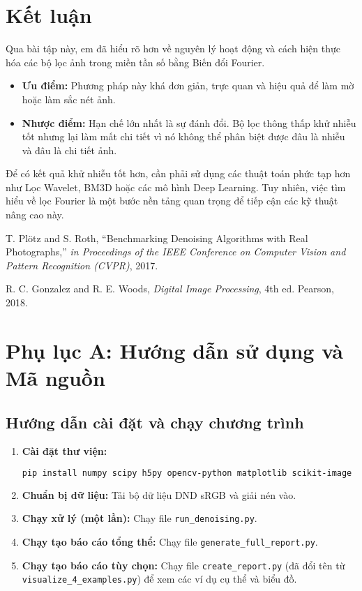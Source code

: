 \documentclass[12pt, a4paper]{article}
\begin{document}
	\section{Kết luận}
	Qua bài tập này, em đã hiểu rõ hơn về nguyên lý hoạt động và cách hiện thực hóa các bộ lọc ảnh trong miền tần số bằng Biến đổi Fourier.
	\begin{itemize}
		\item \textbf{Ưu điểm:} Phương pháp này khá đơn giản, trực quan và hiệu quả để làm mờ hoặc làm sắc nét ảnh.
		\item \textbf{Nhược điểm:} Hạn chế lớn nhất là sự đánh đổi. Bộ lọc thông thấp khử nhiễu tốt nhưng lại làm mất chi tiết vì nó không thể phân biệt được đâu là nhiễu và đâu là chi tiết ảnh.
	\end{itemize}
	Để có kết quả khử nhiễu tốt hơn, cần phải sử dụng các thuật toán phức tạp hơn như Lọc Wavelet, BM3D hoặc các mô hình Deep Learning. Tuy nhiên, việc tìm hiểu về lọc Fourier là một bước nền tảng quan trọng để tiếp cận các kỹ thuật nâng cao này.
	
	

	\begin{thebibliography}{9}
		T. Plötz and S. Roth,
		``Benchmarking Denoising Algorithms with Real Photographs,''
		\textit{in Proceedings of the IEEE Conference on Computer Vision and Pattern Recognition (CVPR)}, 2017.
		
		R. C. Gonzalez and R. E. Woods,
		\textit{Digital Image Processing}, 4th ed.
		Pearson, 2018.
	\end{thebibliography}
	
	
\appendix
\section{Phụ lục A: Hướng dẫn sử dụng và Mã nguồn}
\subsection{Hướng dẫn cài đặt và chạy chương trình}
\begin{enumerate}
	\item \textbf{Cài đặt thư viện:}
	\begin{lstlisting}[language=bash]
		pip install numpy scipy h5py opencv-python matplotlib scikit-image
	\end{lstlisting}
	\item \textbf{Chuẩn bị dữ liệu:} Tải bộ dữ liệu DND sRGB và giải nén vào.
	\item \textbf{Chạy xử lý (một lần):} Chạy file \texttt{run\_denoising.py}.
	\item \textbf{Chạy tạo báo cáo tổng thể:} Chạy file \texttt{generate\_full\_report.py}.
	\item \textbf{Chạy tạo báo cáo tùy chọn:} Chạy file \texttt{create\_report.py} (đã đổi tên từ \texttt{visualize\_4\_examples.py}) để xem các ví dụ cụ thể và biểu đồ.
\end{enumerate}
\end{document}
